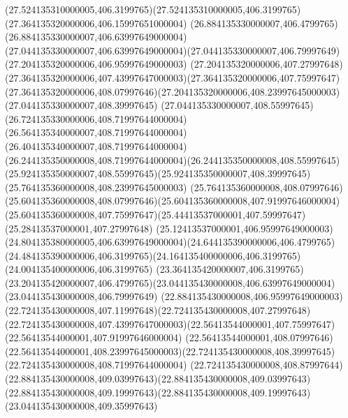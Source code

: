 {{	\curveto(27.524135310000005,406.3199765)(27.524135310000005,406.3199765)(27.364135320000006,406.15997651000004)
	\lineto(26.884135330000007,406.4799765)
	\curveto(26.884135330000007,406.63997649000004)(27.044135330000007,406.63997649000004)(27.044135330000007,406.79997649)
	\lineto(27.204135320000006,406.95997649000003)
	\curveto(27.204135320000006,407.27997648)(27.364135320000006,407.43997647000003)(27.364135320000006,407.75997647)
	\curveto(27.364135320000006,408.07997646)(27.204135320000006,408.23997645000003)(27.044135330000007,408.39997645)
	\curveto(27.044135330000007,408.55997645)(26.724135330000006,408.71997644000004)(26.564135340000007,408.71997644000004)
	\curveto(26.404135340000007,408.71997644000004)(26.244135350000008,408.71997644000004)(26.244135350000008,408.55997645)
	\curveto(25.924135350000007,408.55997645)(25.924135350000007,408.39997645)(25.764135360000008,408.23997645000003)
	\curveto(25.764135360000008,408.07997646)(25.604135360000008,408.07997646)(25.604135360000008,407.91997646000004)
	\curveto(25.604135360000008,407.75997647)(25.44413537000001,407.59997647)(25.28413537000001,407.27997648)
	\curveto(25.12413537000001,406.95997649000003)(24.804135380000005,406.63997649000004)(24.644135390000006,406.4799765)
	\curveto(24.484135390000006,406.3199765)(24.164135400000006,406.3199765)(24.004135400000006,406.3199765)
	\lineto(23.364135420000007,406.3199765)
	\curveto(23.204135420000007,406.4799765)(23.044135430000008,406.63997649000004)(23.044135430000008,406.79997649)
	\curveto(22.884135430000008,406.95997649000003)(22.724135430000008,407.11997648)(22.724135430000008,407.27997648)
	\curveto(22.724135430000008,407.43997647000003)(22.56413544000001,407.75997647)(22.56413544000001,407.91997646000004)
	\curveto(22.56413544000001,408.07997646)(22.56413544000001,408.23997645000003)(22.724135430000008,408.39997645)
	\lineto(22.724135430000008,408.71997644000004)
	\curveto(22.724135430000008,408.87997644)(22.884135430000008,409.03997643)(22.884135430000008,409.03997643)
	\curveto(22.884135430000008,409.19997643)(22.884135430000008,409.19997643)(23.044135430000008,409.35997643)
	\closepath
}
}
{
}
